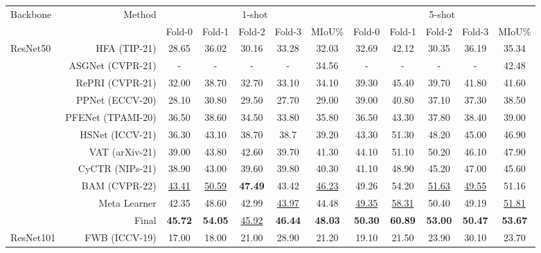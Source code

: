 \documentclass[10pt,twocolumn,letterpaper]{article}
\begin{document}
\begin{table*}[h]
\centering
\begin{adjustbox}{width=0.8\textwidth}
\small
\begin{tabular}{l r| c c c c c | c c c c c }\midrule
\multirow{2}{*}{Backbone} & \multirow{2}{*}{Method} & \multicolumn{5}{c|}{1-shot} & \multicolumn{5}{c}{5-shot}\\
&&Fold-0 & Fold-1 & Fold-2 & Fold-3 & MIoU\% & Fold-0 & Fold-1 & Fold-2 & Fold-3 & MIoU\% \\\midrule
\multirow{11}{*}{ResNet50} & HFA (TIP-21) \cite{FSS4} & 28.65 & 36.02 & 30.16 & 33.28 & 32.03 & 32.69 & 42.12 & 30.35 & 36.19 & 35.34 \\
& ASGNet (CVPR-21) \cite{FSS20asg}& - & - & - & - & 34.56 & - & - & - & - & 42.48\\
& RePRI (CVPR-21) \cite{repri} & 32.00 & 38.70 & 32.70 & 33.10 & 34.10 & 39.30 & 45.40 & 39.70 & 41.80 & 41.60 \\
& PPNet (ECCV-20) \cite{FSS7} & 28.10 & 30.80 & 29.50 & 27.70 & 29.00 & 39.00 & 40.80 & 37.10 & 37.30 & 38.50 \\
& PFENet (TPAMI-20) \cite{FSS2PFE}& 36.50 & 38.60 & 34.50 & 33.80 & 35.80 & 36.50 & 43.30 & 37.80 & 38.40 & 39.00\\
& HSNet (ICCV-21) \cite{FSS9Hsnet}& 36.30 & 43.10 & 38.70 & 38.7 & 39.20 & 43.30 & 51.30 & 48.20 & 45.00 & 46.90 \\
& VAT (arXiv-21) \cite{vat}& 39.00 & 43.80 & 42.60 & 39.70 & 41.30 & 44.10 & 51.10 & 50.20 & 46.10 & 47.90\\
& CyCTR (NIPs-21) \cite{cyctr}& 38.90 & 43.00 & 39.60 & 39.80 & 40.30 & 41.10 & 48.90 & 45.20 & 47.00 & 45.60 \\
& BAM (CVPR-22) \cite{BAM} & \underline{43.41} & \underline{50.59} & \textbf{47.49} & 43.42 & \underline{46.23} & 49.26 & 54.20 & \underline{51.63} & \underline{49.55} & 51.16 \\
\cline{2-12}
&Meta Learner & 42.35 & 48.60 & 42.99 & \underline{43.97} & 44.48 & \underline{49.35} & \underline{58.31} & 50.40 & 49.19 & \underline{51.81}\\
\rowcolor{lightgray}
\cellcolor[HTML]{FFFFFF} & Final & \textbf{45.72} & \textbf{54.05} & \underline{45.92} & \textbf{46.44}& \textbf{48.03} & \textbf{50.30} & \textbf{60.89} & \textbf{53.00} & \textbf{50.47} & \textbf{53.67}\\\midrule
\multirow{6}{*}{ResNet101} & FWB (ICCV-19) \cite{coco20}& 17.00 & 18.00 & 21.00 & 28.90 & 21.20 & 19.10 & 21.50 & 23.90 & 30.10 & 23.70 \\

\end{tabular}
\end{adjustbox}
\end{table*}
\end{document}
